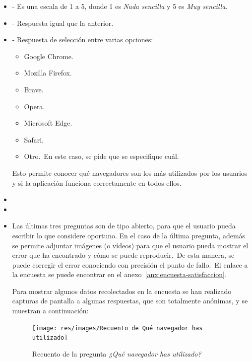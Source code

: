 \begin{itemize}
	\item {} - Es una escala de 1 a 5, donde 1 es
	\textit{Nada sencilla} y 5 es \textit{Muy sencilla}.
	\item {} - Respuesta igual que la anterior.
	\item {} - Respuesta de selección entre varias opciones:
	\begin{itemize}
		\item Google Chrome.
		\item Mozilla Firefox.
		\item Brave.
		\item Opera.
		\item Microsoft Edge.
		\item Safari.
		\item Otro.\ En este caso, se pide que se especifique cuál.
	\end{itemize}
	Esto permite conocer qué navegadores son los más utilizados por los usuarios y si la aplicación funciona
	correctamente en todos ellos.
	\item {}
	\item {}
	\item {}

	Las últimas tres preguntas son de tipo abierto, para que el usuario pueda escribir lo que considere oportuno.
	En el caso de la última pregunta, además se permite adjuntar imágenes (o vídeos) para que el usuario pueda mostrar
	el error que ha encontrado y cómo se puede reproducir.\ De esta manera, se puede corregir el error conociendo
	con precisión el punto de fallo.\ El enlace a la encuesta se puede encontrar en el
	anexo~\ref{anx:encuesta-satisfaccion}.

	Para mostrar algunos datos recolectados en la encuesta se han realizado capturas de pantalla a algunas respuestas,
	que son totalmente anónimas, y se muestran a continuación:

	\begin{figure}[h]
		\centering
		\texttt{[image: res/images/Recuento de Qué navegador has utilizado]}
		\caption{Recuento de la pregunta \textit{¿Qué navegador has utilizado?}}
		\label{fig:recuento-navegador}
	\end{figure}


\end{itemize}
